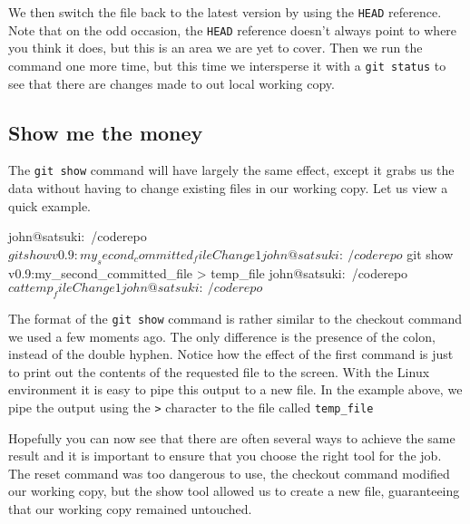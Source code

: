 We then switch the file back to the latest version by using the \texttt{HEAD} reference.
Note that on the odd occasion, the \texttt{HEAD} reference doesn't always point to where you think it does, but this is an area we are yet to cover.
Then we run the command one more time, but this time we intersperse it with a \texttt{git status} to see that there are changes made to out local working copy.

\subsection{Show me the money}
The \texttt{git show} command will have largely the same effect, except it grabs us the data without having to change existing files in our working copy.
Let us view a quick example.

\begin{code}
john@satsuki:~/coderepo$ git show v0.9:my_second_committed_file
Change1
john@satsuki:~/coderepo$ git show v0.9:my_second_committed_file > temp_file
john@satsuki:~/coderepo$ cat temp_file
Change1
john@satsuki:~/coderepo$
\end{code}

The format of the \texttt{git show} command is rather similar to the checkout command we used a few moments ago.
The only difference is the presence of the colon, instead of the double hyphen.
Notice how the effect of the first command is just to print out the contents of the requested file to the screen.
With the Linux environment it is easy to pipe this output to a new file.
In the example above, we pipe the output using the \texttt{>} character to the file called \texttt{temp\_file}

Hopefully you can now see that there are often several ways to achieve the same result and it is important to ensure that you choose the right tool for the job.
The reset command was too dangerous to use, the checkout command modified our working copy, but the show tool allowed us to create a new file, guaranteeing that our working copy remained untouched.

